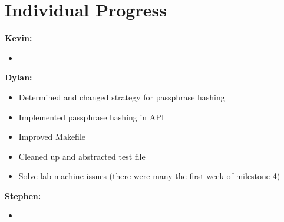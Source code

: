 \documentclass[11pt]{article}
\begin{document}
\section{Individual Progress}

\textbf{Kevin:}
\begin{itemize}
  \item
\end{itemize}

\textbf{Dylan:}
\begin{itemize}
  \item Determined and changed strategy for passphrase hashing
  \item Implemented passphrase hashing in API
  \item Improved Makefile
  \item Cleaned up and abstracted test file
  \item Solve lab machine issues (there were many the first week of milestone 4)
\end{itemize}

\textbf{Stephen:}
\begin{itemize}
  \item
\end{itemize}
\end{document}

